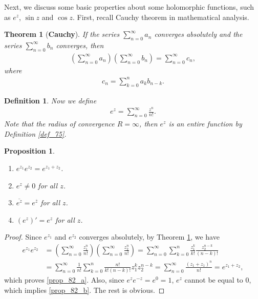 \documentclass[11pt]{book}
\newtheorem{definition}{Definition}[chapter]
\newtheorem{theorem}{Theorem}[chapter]
\newtheorem{proposition}{Proposition}[chapter]
\theoremstyle{definition}
\numberwithin{equation}{chapter}
\begin{document}
Next, we discuss some basic properties about some holomorphic functions, such as $e^z$, $\sin z$ and $\cos z$. First, recall Cauchy theorem in mathematical analysis.

\medskip

\begin{theorem}[{\bf Cauchy}]\label{th_87}
If the series $\sum^\infty_{n=0} a_n$ converges absolutely and the series $\sum^\infty_{n=0} b_n$ converges, then
\begin{align*}
    \left(\sum^\infty_{n=0} a_n\right) \left(\sum^\infty_{n=0} b_n\right) = \sum^\infty_{n=0} c_n,
\end{align*}
where 
\begin{align*}
    c_n = \sum^n_{k=0} a_k b_{n-k}.
\end{align*}
\end{theorem}

\medskip

\begin{definition}
Now we define 
\begin{align*}
    e^z = \sum^\infty_{n=0} \frac{z^n}{n!}.
\end{align*}
Note that the radius of convergence $R = \infty$, then $e^z$ is an entire function by Definition \ref{def_75}.
\end{definition}

\medskip

\begin{proposition}
~\begin{enumerate}[label=(\alph*)]
    \item $e^{z_1} e^{z_2} = e^{z_1 + z_2}$. \label{prop_82_a}
    
    \item $e^z \neq 0$ for all $z$. \label{prop_82_b}
    
    \item $\overline{e^z} = e^{\overline{z}}$ for all $z$.
    
    \item $\left(e^z\right)' = e^z$ for all $z$.
\end{enumerate}
\end{proposition}
\begin{proof}
Since $e^{z_1}$ and $e^{z_2}$ converges absolutely, by Theorem \ref{th_87}, we have
\begin{align*}
    e^{z_1} e^{z_2} & = \left(\sum^\infty_{n=0} \frac{z_1^n}{n!}\right) \left(\sum^\infty_{n=0} \frac{z_2^n}{n!}\right) = \sum^\infty_{n=0} \sum^n_{k=0} \frac{z_1^k}{k!} \frac{z_2^{n-k}}{(n-k)!} \\
    & = \sum^\infty_{n=0} \frac{1}{n!} \sum^n_{k=0} \frac{n!}{k!(n-k)!} z_1^k z_2^{n-k} = \sum^\infty_{n=0} \frac{(z_1 + z_1)^n}{n!} = e^{z_1 + z_2},
\end{align*}
which proves \ref{prop_82_a}. Also, since $e^z e^{-z} = e^0 = 1$, $e^z$ cannot be equal to $0$, which implies \ref{prop_82_b}. The rest is obvious.
\end{proof}
\end{document}
